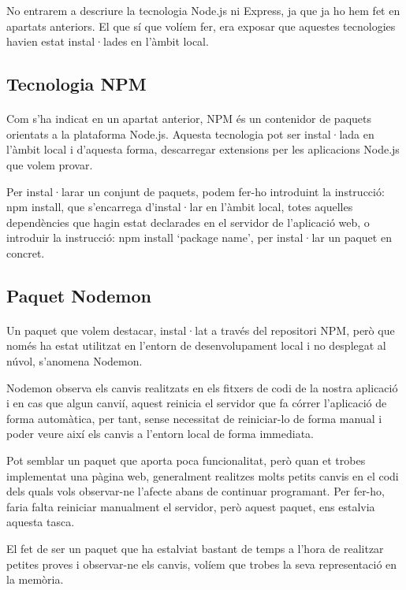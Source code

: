     No entrarem a descriure la tecnologia Node.js ni Express, ja que ja ho hem fet en apartats anteriors. El que sí que volíem fer, era exposar que aquestes tecnologies havien estat instal·lades en l’àmbit local.


    \subsection{Tecnologia NPM}

    \paragraph{}
    Com s'ha indicat en un apartat anterior, NPM és un contenidor de paquets orientats a la plataforma Node.js. Aquesta tecnologia pot ser instal·lada en l'àmbit local i d'aquesta forma, descarregar extensions per les aplicacions Node.js que volem provar.

    Per instal·larar un conjunt de paquets, podem fer-ho introduint la instrucció: npm install, que s’encarrega d’instal·lar en l’àmbit local, totes aquelles dependències que hagin estat declarades en el servidor de l’aplicació web, o introduir la instrucció: npm install `package name’, per instal·lar un paquet en concret.


    \subsection{Paquet Nodemon}

    \paragraph{}
    Un paquet que volem destacar, instal·lat a través del repositori NPM, però que només ha estat utilitzat en l’entorn de desenvolupament local i no desplegat al núvol, s’anomena Nodemon.

    Nodemon observa els canvis realitzats en els fitxers de codi de la nostra aplicació i en cas que algun canvií, aquest reinicia el servidor que fa córrer l'aplicació de forma automàtica, per tant, sense necessitat de reiniciar-lo de forma manual i poder veure així els canvis a l'entorn local de forma immediata.

    Pot semblar un paquet que aporta poca funcionalitat, però quan et trobes implementat una pàgina web, generalment realitzes molts petits canvis en el codi dels quals vols observar-ne l'afecte abans de continuar programant. Per fer-ho, faria falta reiniciar manualment el servidor, però aquest paquet, ens estalvia aquesta tasca.

    El fet de ser un paquet que ha estalviat bastant de temps a l'hora de realitzar petites proves i observar-ne els canvis, volíem que trobes la seva representació en la memòria.
